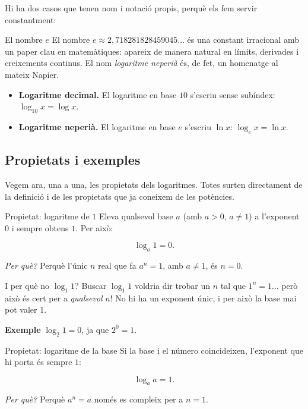 Hi ha dos casos que tenen nom i notació propis, perquè els fem servir constantment:

\begin{nota}{El nombre $e$}
El nombre $e \approx 2{,}718281828459045\ldots$ és una constant irracional amb un paper clau en matemàtiques: apareix de manera natural en límits, derivades i creixements continus. El nom \emph{logaritme neperià} és, de fet, un homenatge al mateix Napier.
\end{nota}

\begin{itemize}
\item \textbf{Logaritme decimal.} El logaritme en base $10$ s'escriu sense subíndex: $\log_{10} x = \log x$.
\item \textbf{Logaritme neperià.} El logaritme en base $e$ s'escriu $\ln x$: $\log_e x = \ln x$.
\end{itemize}

\subsection{Propietats i exemples}

Vegem ara, una a una, les propietats dels logaritmes. Totes surten directament de la definició i de les propietats que ja coneixem de les potències.

\begin{propietat}{Propietat: logaritme de $1$}
Eleva qualsevol base $a$ (amb $a>0$, $a\neq 1$) a l'exponent $0$ i sempre obtens $1$. Per això:

\[
\log_a 1=0.
\]

\emph{Per què?} Perquè l'únic $n$ real que fa $a^{n}=1$, amb $a\neq 1$, és $n=0$.
\end{propietat}

\begin{nota}{I per què no $\log_1 1$?}
Buscar $\log_1 1$ voldria dir trobar un $n$ tal que $1^n=1$... però això és cert per a \emph{qualsevol} $n$! No hi ha un exponent únic, i per això la base mai pot valer $1$.
\end{nota}

\begin{exemple}{\textbf{Exemple}}
$\log_2 1=0$, ja que $2^{0}=1$.
\end{exemple}

\begin{propietat}{Propietat: logaritme de la base}
Si la base i el número coincideixen, l'exponent que hi porta és sempre $1$:

\[
\log_a a = 1.
\]

\emph{Per què?} Perquè $a^n=a$ només es compleix per a $n=1$.
\end{propietat}


